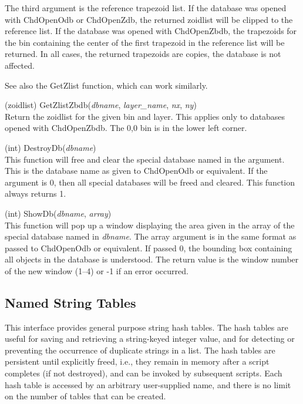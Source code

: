 \begin{description}
The third argument is the reference trapezoid list.  If the database
was opened with {\vt ChdOpenOdb} or {\vt ChdOpenZdb}, the returned
zoidlist will be clipped to the reference list.  If the database was
opened with {\vt ChdOpenZbdb}, the trapezoids for the bin containing the
center of the first trapezoid in the reference list will be returned. 
In all cases, the returned trapezoids are copies, the database is not
affected.

See also the {\vt GetZlist} function, which can work similarly.

\item{(zoidlist) \vt GetZlistZbdb({\it dbname\/}, {\it layer\_name\/},
  {\it nx\/}, {\it ny\/})}\\
Return the zoidlist for the given bin and layer.  This applies only to
databases opened with {\vt ChdOpenZbdb}.  The 0,0 bin is in the lower left
corner.

\item{(int) \vt DestroyDb({\it dbname\/})}\\
This function will free and clear the special database named in the
argument.  This is the database name as given to {\vt ChdOpenOdb} or
equivalent.  If the argument is 0, then all special databases will be
freed and cleared.  This function always returns 1.

\item{(int) \vt ShowDb({\it dbname\/}, {\it array\/})}\\
This function will pop up a window displaying the area given in the
array of the special database named in {\it dbname}.  The array
argument is in the same format as passed to {\vt ChdOpenOdb} or
equivalent.  If passed 0, the bounding box containing all objects in
the database is understood.  The return value is the window number of
the new window (1--4) or -1 if an error occurred.

\end{description}


\subsection{Named String Tables}

This interface provides general purpose string hash tables.  The hash
tables are useful for saving and retrieving a string-keyed integer
value, and for detecting or preventing the occurrence of duplicate
strings in a list.  The hash tables are persistent until explicitly
freed, i.e., they remain in memory after a script completes (if not
destroyed), and can be invoked by subsequent scripts.  Each hash table
is accessed by an arbitrary user-supplied name, and there is no limit
on the number of tables that can be created.

